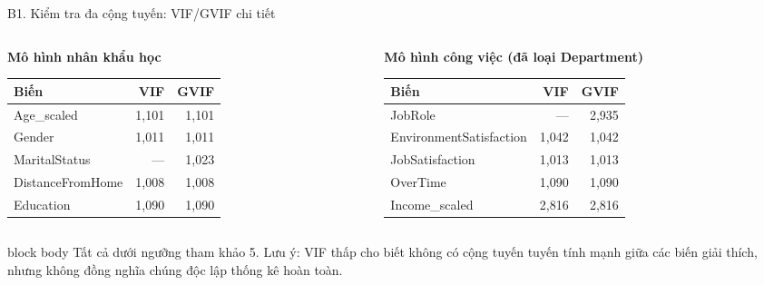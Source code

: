 \documentclass[10pt,aspectratio=169]{beamer}
\begin{document}
\begin{frame}{B1. Kiểm tra đa cộng tuyến: VIF/GVIF chi tiết}
  \begin{columns}[T,onlytextwidth]
    \begin{column}{0.48\textwidth}
      \centering\small
      \textbf{Mô hình nhân khẩu học}\\[0.12cm]
      \scriptsize
      \renewcommand{\arraystretch}{1.2}
      \begin{tabular}{lrr}
        \toprule
        Biến & VIF & GVIF\\
        \midrule
        Age\_scaled & 1,101 & 1,101\\
        Gender & 1,011 & 1,011\\
        MaritalStatus & --- & 1,023\\
        DistanceFromHome & 1,008 & 1,008\\
        Education & 1,090 & 1,090\\
        \bottomrule
      \end{tabular}
    \end{column}
    \begin{column}{0.48\textwidth}
      \centering\small
      \textbf{Mô hình công việc (đã loại Department)}\\[0.12cm]
      \scriptsize
      \renewcommand{\arraystretch}{1.2}
      \begin{tabular}{lrr}
        \toprule
        Biến & VIF & GVIF\\
        \midrule
        JobRole & --- & 2,935\\
        EnvironmentSatisfaction & 1,042 & 1,042\\
        JobSatisfaction & 1,013 & 1,013\\
        OverTime & 1,090 & 1,090\\
        Income\_scaled & 2,816 & 2,816\\
        \bottomrule
      \end{tabular}
    \end{column}
  \end{columns}
  \vspace{0.28cm}
  \begin{beamercolorbox}[sep=0.14cm,rounded=true]{block body}
    \small
    Tất cả dưới ngưỡng tham khảo 5. Lưu ý: VIF thấp cho biết không có
    cộng tuyến tuyến tính mạnh giữa các biến giải thích, nhưng không đồng
    nghĩa chúng độc lập thống kê hoàn toàn.
  \end{beamercolorbox}
\end{frame}
\end{document}
